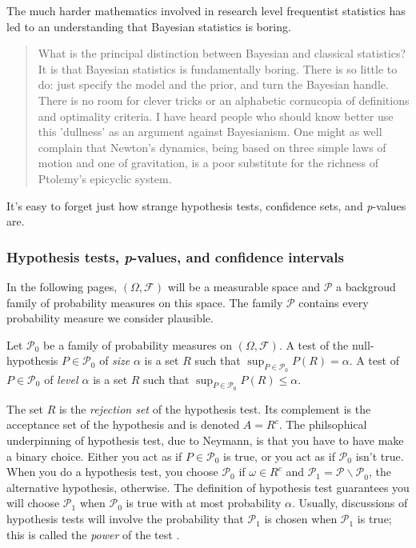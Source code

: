 The much harder mathematics involved in research level frequentist
statistics has led to an understanding that Bayesian statistics is
boring. 
\begin{quote}
What is the principal distinction between Bayesian and classical statistics?
It is that Bayesian statistics is fundamentally boring. There is so
little to do: just specify the model and the prior, and turn the Bayesian
handle. There is no room for clever tricks or an alphabetic cornucopia
of definitions and optimality criteria. I have heard people who should
know better use this 'dullness' as an argument against Bayesianism.
One might as well complain that Newton's dynamics, being based on
three simple laws of motion and one of gravitation, is a poor substitute
for the richness of Ptolemy's epicyclic system. \parencite{Dawid2000-aw}
\end{quote}
It's easy to forget just how strange hypothesis tests, confidence
sets, and \emph{p}-values are. 

\subsubsection{Hypothesis tests, \emph{p}-values, and confidence intervals}

In the following pages, $(\Omega,\mathcal{\mathcal{F}})$ will be
a measurable space and $\mathcal{P}$ a backgroud family of probability
measures on this space. The family $\mathcal{P}$ contains every probability
measure we consider plausible. 
\begin{definition}
\parencite[][Chapter 3.1]{Lehmann2005-sp} Let $\mathcal{P}_{0}$ be a family
of probability measures on $(\Omega,\mathcal{F})$. A test of the
null-hypothesis $P\in\mathcal{P}_{0}$ of \emph{size} $\alpha$ is
a set $R$ such that $\sup_{P\in\mathcal{P}_{0}}P(R)=\alpha.$ A test
of $P\in\mathcal{P}_{0}$ of \emph{level $\alpha$ }is a set $R$
such that $\sup_{P\in\mathcal{P}_{0}}P(R)\leq\alpha.$
\end{definition}

The set $R$ is the \emph{rejection set} of the hypothesis test. Its
complement is the acceptance set of the hypothesis and is denoted
$A=R^{c}$. The philsophical underpinning of hypothesis test, due
to Neymann, is that you have to have make a binary choice. Either
you act as if $P\in\mathcal{P}_{0}$ is true, or you act as if $\mathcal{P}_{0}$
isn't true. When you do a hypothesis test, you choose $\mathcal{P}_{0}$
if $\omega\in R^{c}$ and $\mathcal{P}_{1}=\mathcal{P\backslash P}_{0}$,
the alternative hypothesis, otherwise. The definition of hypothesis
test guarantees you will choose $\mathcal{P}_{1}$ when
$\mathcal{P}_{0}$ is true with at most probability $\alpha$. Usually,
discussions of hypothesis tests will involve the probability that
$\mathcal{P}_{1}$ is chosen when $\mathcal{P}_{1}$ is true; this is called the
\emph{power} of the test \parencite{Neyman1977-nx}.

